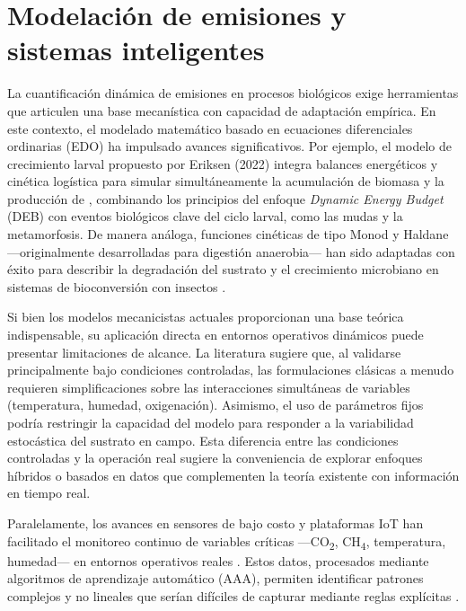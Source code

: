 \section{Modelación de emisiones y sistemas inteligentes}

La cuantificación dinámica de emisiones en procesos biológicos exige herramientas que articulen una base mecanística con capacidad de adaptación empírica. En este contexto, el modelado matemático basado en ecuaciones diferenciales ordinarias (EDO) ha impulsado avances significativos. Por ejemplo, el modelo de crecimiento larval propuesto por Eriksen (2022) integra balances energéticos y cinética logística para simular simultáneamente la acumulación de biomasa y la producción de , combinando los principios del enfoque \textit{Dynamic Energy Budget} (DEB) con eventos biológicos clave del ciclo larval, como las mudas y la metamorfosis. De manera análoga, funciones cinéticas de tipo Monod y Haldane —originalmente desarrolladas para digestión anaerobia— han sido adaptadas con éxito para describir la degradación del sustrato y el crecimiento microbiano en sistemas de bioconversión con insectos \parencite{winAnaerobicDigestionBlack2018a, ahlamineMathematicalAnalysisAnaerobic2024}. 

Si bien los modelos mecanicistas actuales proporcionan una base teórica indispensable, su aplicación directa en entornos operativos dinámicos puede presentar limitaciones de alcance. La literatura \parencite{bekkerImpactSubstrateMoisture2021a,rossiEstimatingDynamicsGreenhouse2024a} sugiere que, al validarse principalmente bajo condiciones controladas, las formulaciones clásicas a menudo requieren simplificaciones sobre las interacciones simultáneas de variables (temperatura, humedad, oxigenación). Asimismo, el uso de parámetros fijos podría restringir la capacidad del modelo para responder a la variabilidad estocástica del sustrato en campo. Esta diferencia entre las condiciones controladas y la operación real sugiere la conveniencia de explorar enfoques híbridos o basados en datos que complementen la teoría existente con información en tiempo real.

Paralelamente, los avances en sensores de bajo costo y plataformas IoT han 
facilitado el monitoreo continuo de variables críticas —CO\textsubscript{2}, 
CH\textsubscript{4}, temperatura, humedad— en entornos operativos reales 
\parencite{rajRealTimeEstimation2023a,duobieneDevelopmentWirelessSensor2022,
yavariArtEMonArtificialIntelligence2023}. Estos datos, procesados mediante 
algoritmos de aprendizaje automático (AAA), permiten identificar patrones 
complejos y no lineales que serían difíciles de capturar mediante reglas 
explícitas \parencite{weichertReviewMachineLearning2019,chenOptimizationModelProcess2021a}. 

